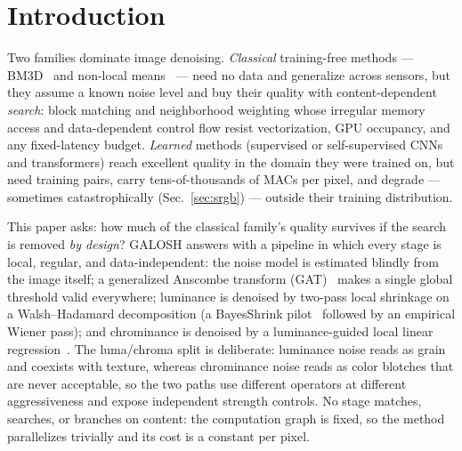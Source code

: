 \documentclass[10pt,twocolumn]{article}
\begin{document}
\section{Introduction}
Two families dominate image denoising. \emph{Classical} training-free methods
--- BM3D~\cite{bm3d} and non-local means~\cite{nlm} --- need no data and
generalize across sensors, but they assume a known noise level and buy their
quality with content-dependent \emph{search}: block matching and neighborhood
weighting whose irregular memory access and data-dependent control flow resist
vectorization, GPU occupancy, and any fixed-latency budget. \emph{Learned}
methods (supervised or self-supervised CNNs and transformers) reach excellent
quality in the domain they were trained on, but need training pairs, carry
tens-of-thousands of MACs per pixel, and degrade --- sometimes catastrophically
(Sec.~\ref{sec:srgb}) --- outside their training distribution.

This paper asks: how much of the classical family's quality survives if the
search is removed \emph{by design}? GALOSH answers with a pipeline in which
every stage is local, regular, and data-independent: the noise model is
estimated blindly from the image itself; a generalized Anscombe transform
(GAT)~\cite{foi} makes a single global threshold valid everywhere; luminance is
denoised by two-pass local shrinkage on a Walsh--Hadamard decomposition (a
BayesShrink pilot~\cite{bayesshrink} followed by an empirical Wiener pass); and
chrominance is denoised by a luminance-guided local linear
regression~\cite{loess,kopf}. The luma/chroma split is deliberate: luminance
noise reads as grain and coexists with texture, whereas chrominance noise
reads as color blotches that are never acceptable, so the two paths use
different operators at different aggressiveness and expose independent
strength controls. No stage matches, searches, or branches on
content: the computation graph is fixed, so the method parallelizes trivially
and its cost is a constant per pixel.
\end{document}
